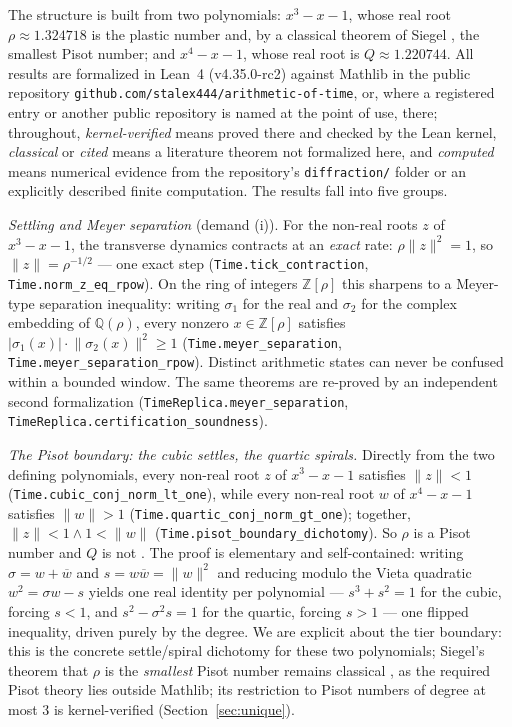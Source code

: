 \documentclass[11pt]{amsart}
\theoremstyle{plain}
\theoremstyle{definition}
\theoremstyle{remark}
\newcommand{\leanpin}{Lean~4 (v4.35.0-rc2) against Mathlib}
\begin{document}
The structure is built from two polynomials: $x^3 - x - 1$, whose real root $\rho \approx 1.324718$ is the plastic number \cite{aarts2001} and, by a classical theorem of Siegel \cite{siegel1944}, the smallest Pisot number; and $x^4 - x - 1$, whose real root is $Q \approx 1.220744$. All results are formalized in \leanpin{} in the public repository \texttt{github.com/stalex444/arithmetic-of-time}, or, where a registered entry or another public repository is named at the point of use, there; throughout, \emph{kernel-verified} means proved there and checked by the Lean kernel, \emph{classical} or \emph{cited} means a literature theorem not formalized here, and \emph{computed} means numerical evidence from the repository's \texttt{diffraction/} folder or an explicitly described finite computation. The results fall into five groups.

\emph{Settling and Meyer separation} (demand (i)). For the non-real roots $z$ of $x^3 - x - 1$, the transverse dynamics contracts at an \emph{exact} rate: $\rho \lVert z \rVert^2 = 1$, so $\lVert z \rVert = \rho^{-1/2}$ --- one exact step (\texttt{Time.tick\_contraction}, \texttt{Time.norm\_z\_eq\_rpow}). On the ring of integers $\mathbb{Z}[\rho]$ this sharpens to a Meyer-type separation inequality: writing $\sigma_1$ for the real and $\sigma_2$ for the complex embedding of $\mathbb{Q}(\rho)$, every nonzero $x \in \mathbb{Z}[\rho]$ satisfies $\lvert \sigma_1(x) \rvert \cdot \lVert \sigma_2(x) \rVert^2 \ge 1$ (\texttt{Time.meyer\_separation}, \texttt{Time.meyer\_separation\_rpow}). Distinct arithmetic states can never be confused within a bounded window. The same theorems are re-proved by an independent second formalization (\texttt{TimeReplica.meyer\_separation}, \texttt{TimeReplica.certification\_soundness}).

\emph{The Pisot boundary: the cubic settles, the quartic spirals.} Directly from the two defining polynomials, every non-real root $z$ of $x^3 - x - 1$ satisfies $\lVert z \rVert < 1$ (\texttt{Time.cubic\_conj\_norm\_lt\_one}), while every non-real root $w$ of $x^4 - x - 1$ satisfies $\lVert w \rVert > 1$ (\texttt{Time.quartic\_conj\_norm\_gt\_one}); together, $\lVert z \rVert < 1 \wedge 1 < \lVert w \rVert$ (\texttt{Time.pisot\_boundary\_dichotomy}). So $\rho$ is a Pisot number and $Q$ is not \cite{bertin1992}. The proof is elementary and self-contained: writing $\sigma = w + \overline{w}$ and $s = w \overline{w} = \lVert w \rVert^2$ and reducing modulo the Vieta quadratic $w^2 = \sigma w - s$ yields one real identity per polynomial --- $s^3 + s^2 = 1$ for the cubic, forcing $s < 1$, and $s^2 - \sigma^2 s = 1$ for the quartic, forcing $s > 1$ --- one flipped inequality, driven purely by the degree. We are explicit about the tier boundary: this is the concrete settle/spiral dichotomy for these two polynomials; Siegel's theorem that $\rho$ is the \emph{smallest} Pisot number remains classical \cite{siegel1944}, as the required Pisot theory lies outside Mathlib; its restriction to Pisot numbers of degree at most $3$ is kernel-verified (Section~\ref{sec:unique}).
\end{document}
